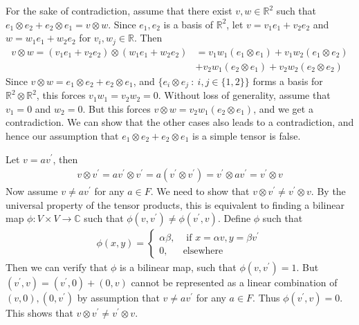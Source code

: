 \documentclass[12pt]{exam}
\theoremstyle{plain} %
\theoremstyle{definition} %
\theoremstyle{remark} %
\begin{document}
\begin{questions}
  \question
  \begin{solution}
    For the sake of contradiction, assume that there exist $v, w \in
    \mathbb{R}^2$ such that $e_1 \otimes e_2 + e_2 \otimes e_1 = v
    \otimes w$. Since $e_1, e_2$ is a basis of $\mathbb{R}^2$, let $
    v = v_1 e_1 + v_2 e_2$ and $w = w_1 e_1 + w_2 e_2$ for $v_i, w_j
    \in \mathbb{R}$. Then
    \begin{align*}
      v \otimes w = (v_1 e_1 + v_2 e_2) \otimes (w_1 e_1 + w_2 e_2) &=
      v_1w_1 (e_1 \otimes e_1) + v_1 w_2 (e_1 \otimes e_2) \\
      &+ v_2w_1 ( e_2 \otimes e_1) + v_2w_2( e_2 \otimes e_2)
    \end{align*}
    Since $v \otimes w = e_1 \otimes e_2 + e_2 \otimes e_1$, and $\{
    e_i \otimes e_j \ : \ i , j \in \{ 1, 2 \} \}$ forms a basis for
    $ \mathbb{R}^2 \otimes \mathbb{R}^2$, this forces $v_1w_1 =
    v_2w_2 = 0$. Without loss of generality, assume that $v_1 = 0$
    and $w_2 = 0$. But this forces $v \otimes w = v_2w_1 (e_2 \otimes
    e_1)$, and we get a contradiction. We can show that the other
    cases also leads to a contradiction, and hence our assumption
    that $e_1 \otimes e_2 + e_2 \otimes e_1$ is a simple tensor is false.
  \end{solution}

  \question
  \begin{solution}
    Let $v = av^\prime$, then
    \begin{align*}
      v \otimes v^\prime = av^\prime \otimes v^\prime = a(v^\prime
      \otimes v^\prime) = v^\prime \otimes av^\prime = v^\prime \otimes v
    \end{align*}
    Now assume $v \neq a v^\prime$ for any $a \in F$. We need to show
    that $v \otimes v^\prime \neq v^\prime \otimes v$. By the
    universal property of the tensor products, this is equivalent to
    finding a bilinear map $\phi : V \times V \to \mathbb{C}$ such
    that $\phi(v, v^\prime) \neq \phi(v^\prime, v)$. Define $\phi$ such that
    \begin{align*}
      \phi(x, y) =
      \begin{cases}
        \alpha \beta, & \textrm{ if } x = \alpha v, y = \beta v^\prime \\
        0, & \textrm{elsewhere}
      \end{cases}
    \end{align*}
    Then  we can verify that $\phi$ is a bilinear map, such that
    $\phi(v, v^\prime) = 1$. But $(v^\prime, v) = (v^\prime, 0)
    + (0, v)$ cannot be represented as a linear combination of $(v,
    0), (0, v^\prime)$ by assumption that $v \neq a v^\prime$ for any
    $a \in F$. Thus $\phi(v^\prime, v) = 0$. This shows that $v
    \otimes v^\prime \neq v^\prime \otimes v$.
  \end{solution}


\end{questions}
\end{document}
